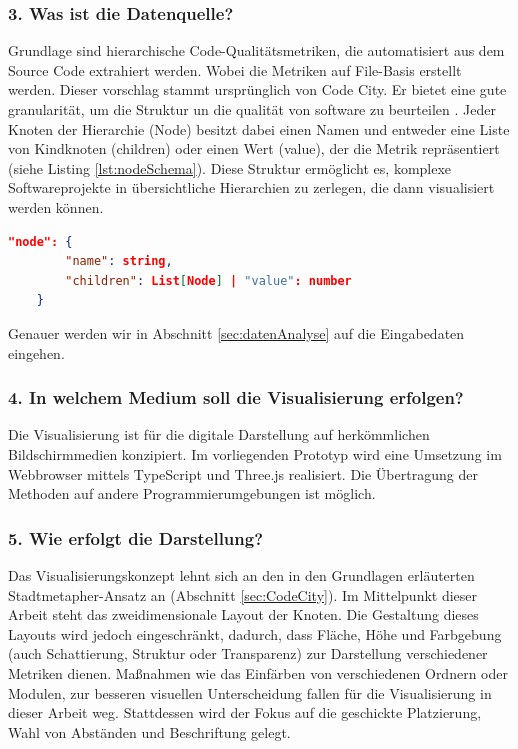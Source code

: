 \subsubsection*{3. Was ist die Datenquelle?}
Grundlage sind hierarchische Code-Qualitätsmetriken, die automatisiert aus dem Source Code extrahiert werden. Wobei die Metriken auf File-Basis erstellt werden. Dieser vorschlag stammt ursprünglich von Code City. Er bietet eine gute granularität, um die Struktur un die qualität von software zu beurteilen \cite{codeCity1}. Jeder Knoten der Hierarchie (Node) besitzt dabei einen Namen und entweder eine Liste von Kindknoten (children) oder einen Wert (value), der die Metrik repräsentiert (siehe Listing \ref{lst:nodeSchema}). 
Diese Struktur ermöglicht es, komplexe Softwareprojekte in übersichtliche Hierarchien zu zerlegen, die dann visualisiert werden können.

\begin{lstlisting}[language=json, caption={Schema einer Node}, label={lst:nodeSchema}]
    "node": {
        "name": string,
        "children": List[Node] | "value": number
    }
\end{lstlisting}

Genauer werden wir in Abschnitt \ref{sec:datenAnalyse} auf die Eingabedaten eingehen.

\subsubsection*{4. In welchem Medium soll die Visualisierung erfolgen?}
Die Visualisierung ist für die digitale Darstellung auf herkömmlichen Bildschirmmedien konzipiert. Im vorliegenden Prototyp wird eine Umsetzung im Webbrowser mittels TypeScript und Three.js realisiert. Die Übertragung der Methoden auf andere Programmierumgebungen ist möglich.

\subsubsection*{5. Wie erfolgt die Darstellung?}
Das Visualisierungskonzept lehnt sich an den in den Grundlagen erläuterten Stadtmetapher-Ansatz an (Abschnitt \ref{sec:CodeCity}). Im Mittelpunkt dieser Arbeit steht das zweidimensionale Layout der Knoten. Die Gestaltung dieses Layouts wird jedoch eingeschränkt, dadurch, dass Fläche, Höhe und Farbgebung (auch Schattierung, Struktur oder Transparenz) zur Darstellung verschiedener Metriken dienen. Maßnahmen wie das Einfärben von verschiedenen Ordnern oder Modulen, zur besseren visuellen Unterscheidung fallen für die Visualisierung in dieser Arbeit weg. Stattdessen wird der Fokus auf die geschickte Platzierung, Wahl von Abständen und Beschriftung gelegt. 


